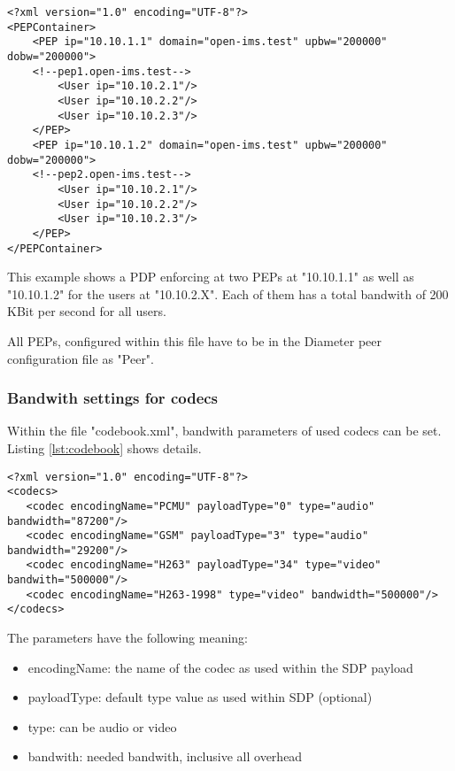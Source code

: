 \begin{lstlisting}[caption=Example of a PEP settings file, label={lst:PEPContainer}]
<?xml version="1.0" encoding="UTF-8"?>
<PEPContainer>
	<PEP ip="10.10.1.1" domain="open-ims.test" upbw="200000" dobw="200000">
	<!--pep1.open-ims.test-->
		<User ip="10.10.2.1"/>
		<User ip="10.10.2.2"/>
		<User ip="10.10.2.3"/>
	</PEP>
	<PEP ip="10.10.1.2" domain="open-ims.test" upbw="200000" dobw="200000">
	<!--pep2.open-ims.test-->
		<User ip="10.10.2.1"/>
		<User ip="10.10.2.2"/>
		<User ip="10.10.2.3"/>
	</PEP>
</PEPContainer>
\end{lstlisting}
This example shows a PDP enforcing at two PEPs at "10.10.1.1" as well as "10.10.1.2" for the users at "10.10.2.X".
Each of them has a total bandwith of 200 KBit per second for all users.

All PEPs, configured within this file have to be in the Diameter peer configuration file as "Peer".

\subsubsection{Bandwith settings for codecs}
Within the file "codebook.xml", bandwith parameters of used codecs can be set.
Listing \ref{lst:codebook} shows details.

\begin{lstlisting}[caption=Example of a PEP settings file, label={lst:codebook}]
<?xml version="1.0" encoding="UTF-8"?>
<codecs>
   <codec encodingName="PCMU" payloadType="0" type="audio" bandwidth="87200"/>
   <codec encodingName="GSM" payloadType="3" type="audio" bandwidth="29200"/>
   <codec encodingName="H263" payloadType="34" type="video" bandwith="500000"/>
   <codec encodingName="H263-1998" type="video" bandwidth="500000"/>
</codecs>
\end{lstlisting}
The parameters have the following meaning:
\begin{itemize}
	\item encodingName: the name of the codec as used within the SDP payload
	\item payloadType: default type value as used within SDP (optional)
	\item type: can be audio or video
	\item bandwith: needed bandwith, inclusive all overhead
\end{itemize}



